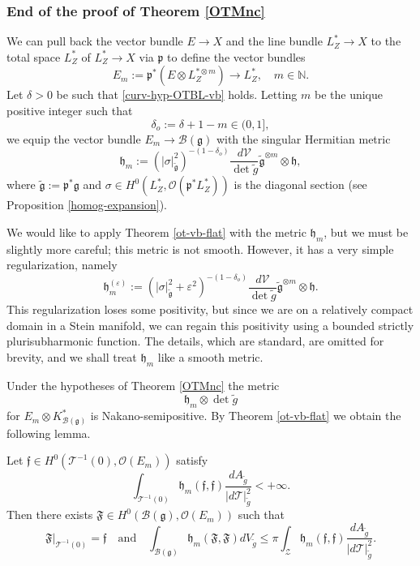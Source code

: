 \documentclass[12pt,hidelinks]{amsart}
\newcommand{\cO}{{\mathcal O}}
\newcommand{\cZ}{{\mathcal Z}}
\newcommand{\sB}{{\mathscr B}}
\newcommand{\sT}{{\mathscr T}}
\newcommand{\sV}{{\mathscr V}}
\newcommand{\fF}{{\mathfrak F}}
\newcommand{\ff}{{\mathfrak f}}
\newcommand{\fg}{{\mathfrak g}}
\newcommand{\fh}{{\mathfrak h}}
\newcommand{\fp}{{\mathfrak p}}
\newcommand{\ve}{\varepsilon}
\newcommand{\bbN}{{\mathbb N}}
\newcommand{\tensor}{\otimes}
\begin{document}
\subsubsection*{\bf End of the proof of Theorem \ref{OTMnc}}
We can pull back the vector bundle $E \to X$ and the line bundle $L_Z ^* \to X$ to the total space $L_Z ^*$ of $L_Z^* \to X$ via $\fp$ to define the vector bundles 
\[
E_m := \fp ^* (E \tensor L_Z ^{*\tensor m}) \to L_Z^*, \quad m \in \bbN.
\]
Let $\delta > 0$ be such that \eqref{curv-hyp-OTBL-vb} holds.  Letting $m$ be the unique positive integer such that 
\[
\delta _o := \delta +1 - m \in (0,1],
\]
we equip the vector bundle $E_m \to \sB(\fg)$ with the singular Hermitian metric 
\begin{equation}\label{db-metric}
\fh _m := (|\sigma |^2_{\tilde \fg})^{-(1-\delta_o)} \frac{d\sV}{\det \tilde g} \tilde \fg ^{\tensor m} \tensor \fh,
\end{equation}
where $\tilde \fg := \fp ^* \fg$ and $\sigma \in H^0(L_Z^*, \cO (\fp ^* L_Z^*))$ is the diagonal section (see Proposition \ref{homog-expansion}).  

We would like to apply Theorem \ref{ot-vb-flat} with the metric $\fh _m$, but we must be slightly more careful; this metric is not smooth.  However, it has a very simple regularization, namely 
\[
\fh _m ^{(\ve)} := (|\sigma |^2_{\tilde \fg}+ \ve^2 )^{-(1-\delta_o)} \frac{d\sV}{\det \tilde g} \tilde \fg ^{\tensor m} \tensor \fh.
\]
This regularization loses some positivity, but since we are on a relatively compact domain in a Stein manifold, we can regain this positivity using a bounded strictly plurisubharmonic function.  The details, which are standard, are omitted for brevity, and we shall treat $\fh_m$ like a smooth metric.

Under the hypotheses of Theorem \ref{OTMnc} %
the metric 
\[
\fh _m \tensor \det \tilde g
\]
for $E_m \tensor K^*_{\sB (\fg)}$ is Nakano-semipositive.  By Theorem \ref{ot-vb-flat} we obtain the following lemma.

\begin{lem}\label{ot-vb-db}
Let $\ff \in H^0(\sT ^{-1}(0), \cO (E_m))$ satisfy
\[
\int _{\sT^{-1}(0)} \fh _m (\ff, \ff) \frac{dA_{\tilde g}}{|d\sT|^2_{\tilde g}} < +\infty.
\]
Then there exists $\fF \in H^0(\sB(\fg), \cO (E_m))$ such that 
\[
\fF |_{\sT^{-1}(0)} = \ff \quad \text{and} \quad \int _{\sB(\fg)} \fh _m (\fF, \fF) dV_{\tilde g} \le \pi \int _{\cZ} \fh _m (\ff, \ff) \frac{dA_{\tilde g}}{|d\sT|^2_{\tilde g}}.
\]
\end{lem}
\end{document}
